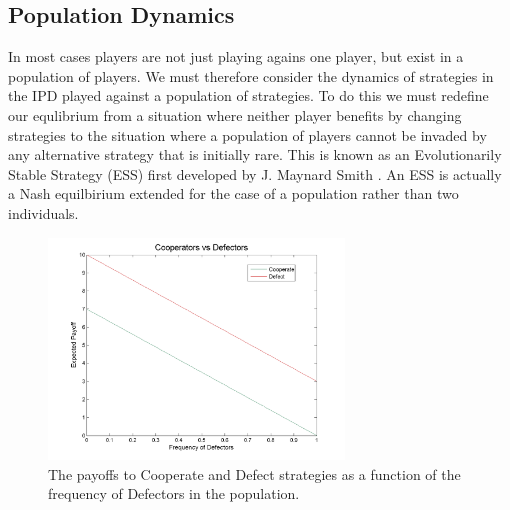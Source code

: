 \documentclass[11pt]{article} %
\begin{document}
\subsection{Population Dynamics}
In most cases players are not just playing agains one player, but exist in a population of players. We must therefore consider the dynamics of strategies in the IPD played against a population of strategies. To do this we must redefine our equlibrium from a situation where neither player benefits by changing strategies to the situation where a population of players cannot be invaded by any alternative strategy that is initially rare. This is known as an Evolutionarily Stable Strategy (ESS) first developed by J. Maynard Smith \cite{smithprice1973}. An ESS is actually a Nash equilbirium extended for the case of a population rather than two individuals. 

\begin{figure}[ht]
	\includegraphics[width=0.7\textwidth]{files/figures/DvsC.png}
	\caption{The payoffs to Cooperate and Defect strategies as a function of the frequency of Defectors in the population.}
	\label{cvsd}
\end{figure}
\end{document}
